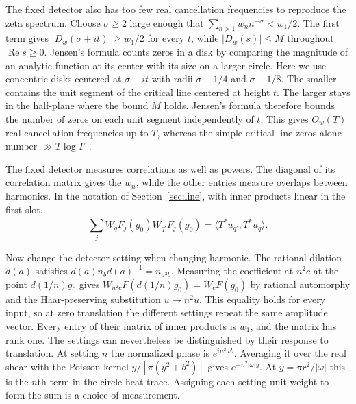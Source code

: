 \documentclass[11pt,letterpaper]{article}
\numberwithin{equation}{section}
\begin{document}
The fixed detector also has too few real cancellation frequencies to reproduce the zeta spectrum. Choose $\sigma\geq2$ large enough that $\sum_{n>1}w_n n^{-\sigma}<w_1/2$. The first term gives $|D_w(\sigma+it)|\geq w_1/2$ for every $t$, while $|D_w(s)|\leq M$ throughout $\operatorname{Re}s\geq0$. Jensen's formula counts zeros in a disk by comparing the magnitude of an analytic function at its center with its size on a larger circle. Here we use concentric disks centered at $\sigma+it$ with radii $\sigma-1/4$ and $\sigma-1/8$. The smaller contains the unit segment of the critical line centered at height $t$. The larger stays in the half-plane where the bound $M$ holds. Jensen's formula therefore bounds the number of zeros on each unit segment independently of $t$. This gives $O_w(T)$ real cancellation frequencies up to $T$, whereas the simple critical-line zeros alone number $\gg T\log T$~\cite{bcy}.

The fixed detector measures correlations as well as powers. The diagonal of its correlation matrix gives the $w_n$, while the other entries measure overlaps between harmonics. In the notation of Section~\ref{sec:line}, with inner products linear in the first slot,
\[
 \sum_j W_qF_j(g_0)\overline{W_{q'}F_j(g_0)}
    =\langle T^*u_{q'},T^*u_q\rangle .
\]

Now change the detector setting when changing harmonic. The rational dilation $d(a)$ satisfies $d(a)n_bd(a)^{-1}=n_{a^2 b}$. Measuring the coefficient at $n^2c$ at the point $d(1/n)g_0$ gives $W_{n^2c}F(d(1/n)g_0)=W_cF(g_0)$ by rational automorphy and the Haar-preserving substitution $u\mapsto n^2u$. This equality holds for every input, so at zero translation the different settings repeat the same amplitude vector. Every entry of their matrix of inner products is $w_1$, and the matrix has rank one. The settings can nevertheless be distinguished by their response to translation. At setting $n$ the normalized phase is $e^{in^2\omega b}$. Averaging it over the real shear with the Poisson kernel $y/[\pi(y^2+b^2)]$ gives $e^{-n^2|\omega|y}$. At $y=\pi r^2/|\omega|$ this is the $n$th term in the circle heat trace. Assigning each setting unit weight to form the sum is a choice of measurement.
\end{document}
